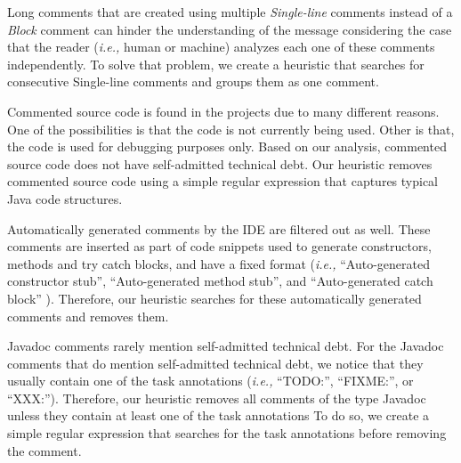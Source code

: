 Long comments that are created using multiple \emph{Single-line} comments instead of a \emph{Block} comment can hinder the understanding of the message considering the case that the reader (\textit{i.e.,} human or machine) analyzes each one of these comments independently. To solve that problem, we create a heuristic that searches for consecutive Single-line comments and groups them as one  comment.
 
Commented source code is found in the projects due to many different reasons. One of the possibilities is that the code is not currently being used. Other is that, the code is used for debugging purposes only. Based on our analysis, commented source code does not have self-admitted technical debt. Our heuristic removes commented source code using a simple regular expression that captures typical Java code structures.

Automatically generated comments by the IDE are filtered out as well. These comments are inserted as part of code snippets used to generate constructors, methods and try catch blocks, and have a fixed format (\textit{i.e.,} ``Auto-generated constructor stub'', ``Auto-generated method stub'', and ``Auto-generated catch block'' ). Therefore, our heuristic searches for these automatically generated comments and removes them. 

Javadoc comments rarely mention self-admitted technical debt. For the Javadoc comments that do mention self-admitted technical debt, we notice that they usually 
 contain one of the task annotations (\textit{i.e.,} ``TODO:'', ``FIXME:'', or ``XXX:''). Therefore, our heuristic removes all comments of the type Javadoc unless they contain at least one of the task annotations  To do so, we create a simple regular expression that searches for the task annotations before removing the comment.  


